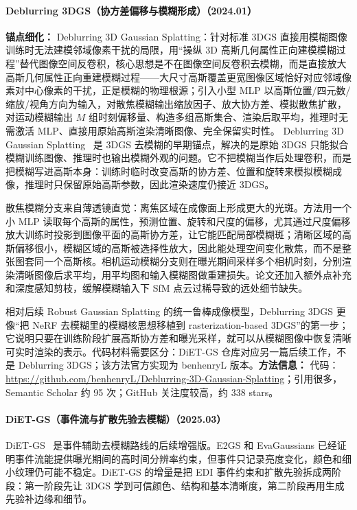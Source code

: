 \paragraph{Deblurring 3DGS（协方差偏移与模糊形成）（2024.01）}
\textbf{锚点细化：} Deblurring 3D Gaussian Splatting：针对标准 3DGS 直接用模糊图像训练时无法建模邻域像素干扰的局限，用``操纵 3D 高斯几何属性正向建模模糊过程''替代图像空间反卷积，核心思想是不在图像空间反卷积去模糊，而是直接放大高斯几何属性正向重建模糊过程——大尺寸高斯覆盖更宽图像区域恰好对应邻域像素对中心像素的干扰，正是模糊的物理根源；引入小型 MLP 以高斯位置/四元数/缩放/视角方向为输入，对散焦模糊输出缩放因子、放大协方差、模拟散焦扩散，对运动模糊输出 $M$ 组时刻偏移量、构造多组高斯集合、渲染后取平均，推理时无需激活 MLP、直接用原始高斯渲染清晰图像、完全保留实时性。
Deblurring 3D Gaussian Splatting~\cite{2401_00834} 是 3DGS 去模糊的早期锚点，解决的是原始 3DGS 只能拟合模糊训练图像、推理时也输出模糊外观的问题。它不把模糊当作后处理卷积，而是把模糊写进高斯本身：训练时临时改变高斯的协方差、位置和旋转来模拟模糊成像，推理时只保留原始高斯参数，因此渲染速度仍接近 3DGS。

散焦模糊分支来自薄透镜直觉：离焦区域在成像面上形成更大的光斑。方法用一个小 MLP 读取每个高斯的属性，预测位置、旋转和尺度的偏移，尤其通过尺度偏移放大训练时投影到图像平面的高斯协方差，让它能匹配局部模糊斑；清晰区域的高斯偏移很小，模糊区域的高斯被选择性放大，因此能处理空间变化散焦，而不是整张图套同一个高斯核。相机运动模糊分支则在曝光期间采样多个相机时刻，分别渲染清晰图像后求平均，用平均图和输入模糊图做重建损失。论文还加入额外点补充和深度感知剪枝，缓解模糊输入下 SfM 点云过稀导致的远处细节缺失。

相对后续 Robust Gaussian Splatting 的统一鲁棒成像模型，Deblurring 3DGS 更像“把 NeRF 去模糊里的模糊核思想移植到 rasterization-based 3DGS”的第一步；它说明只要在训练阶段扩展高斯协方差和曝光采样，就可以从模糊图像中恢复清晰可实时渲染的表示。代码材料需要区分：DiET-GS 仓库对应另一篇后续工作，不是 Deblurring 3DGS；该方法官方实现为 benhenryL 版本。\textbf{方法信息：} 代码：\url{https://github.com/benhenryL/Deblurring-3D-Gaussian-Splatting}；引用很多，Semantic Scholar 约 95 次；GitHub 关注度较高，约 338 stars。



\paragraph{DiET-GS（事件流与扩散先验去模糊）（2025.03）}
DiET-GS~\cite{2503_24210} 是事件辅助去模糊路线的后续增强版。E2GS 和 EvaGaussians 已经证明事件流能提供曝光期间的高时间分辨率约束，但事件只记录亮度变化，颜色和细小纹理仍可能不稳定。DiET-GS 的增量是把 EDI 事件约束和扩散先验拆成两阶段：第一阶段先让 3DGS 学到可信颜色、结构和基本清晰度，第二阶段再用生成先验补边缘和细节。

